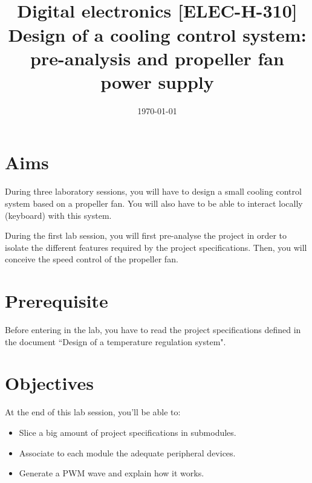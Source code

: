 \documentclass[11pt,a4paper]{article}
\date{\vspace{-1.7cm}\mydate\today}
\title{\vspace{-2cm}\labonumber \\ Digital electronics [ELEC-H-310]\\Design of a cooling control system: \\ pre-analysis and propeller fan power supply\ifthenelse{\boolean{corrige}}{~\\Corrigé}{}}
\theoremstyle{definition}%
\begin{document}
\pagestyle{empty}
\maketitle





\section*{Aims}
During three laboratory sessions, you will have to design a small cooling control system based on a propeller fan.
You will also have to be able to interact locally (keyboard) with this system.

During the first lab session, you will first pre-analyse the project in order to isolate the different features required by the project specifications.
Then, you will conceive the speed control of the propeller fan.

\section*{Prerequisite}
Before entering in the lab, you have to read the project specifications defined in the document ``Design of a temperature regulation system".


\section*{Objectives}
At the end of this lab session, you'll be able to:
\begin{itemize}
	\item Slice a big amount of project specifications in submodules.
	\item Associate to each module the adequate peripheral devices.
	\item Generate a PWM wave and explain how it works.
\end{itemize}


\newpage


\end{document}
